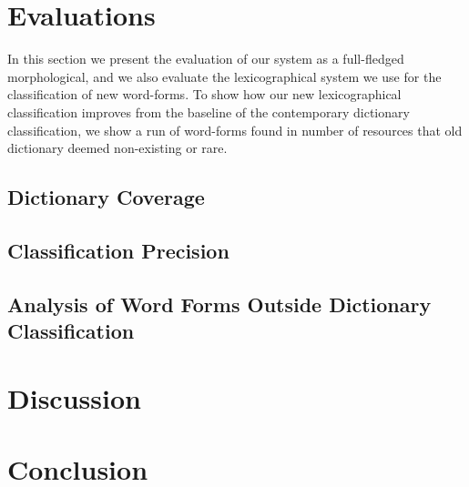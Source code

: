 \documentclass[a4paper,12pt]{article}
\begin{document}
\section{Evaluations}

In this section we present the evaluation of our system as a full-fledged
morphological, and we also evaluate the lexicographical system we use for
the classification of new word-forms. To show how our new lexicographical
classification improves from the baseline of the contemporary dictionary
classification, we show a run of word-forms found in number of resources that
old dictionary deemed non-existing or rare.

\subsection{Dictionary Coverage}


\subsection{Classification Precision}


\subsection{Analysis of Word Forms Outside Dictionary Classification}


\section{Discussion}


\section{Conclusion}





\end{document}
